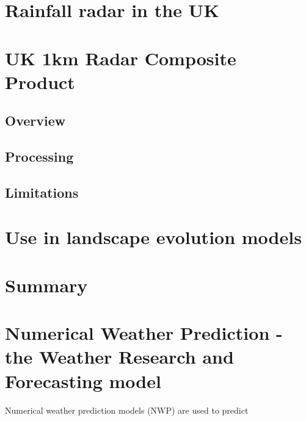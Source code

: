 \section{Rainfall radar in the UK}

\section{UK 1km Radar Composite Product}
\label{NIMROD}

\subsection{Overview}

\subsection{Processing}

\subsection{Limitations}

\section{Use in landscape evolution models}

\section{Summary}

%
%

\section{Numerical Weather Prediction - the Weather Research and Forecasting model}
\label{WRF}

Numerical weather prediction models (NWP) are used to predict 
